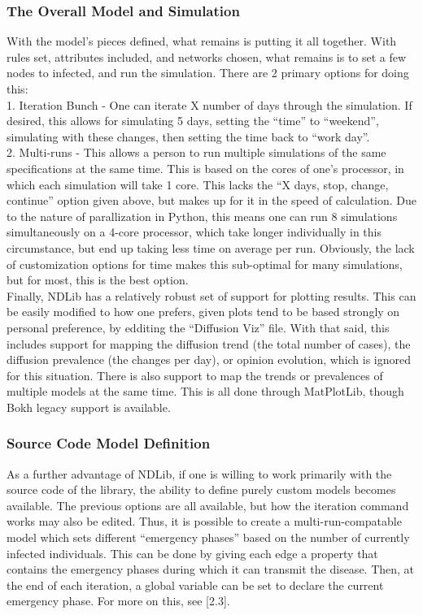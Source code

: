 \documentclass{article}
\numberwithin{equation}{section} %
\begin{document}
\begin{multicols}{2}
  \subsubsection{The Overall Model and Simulation}
  With the model's pieces defined, what remains is putting it all together. With rules set, attributes included, and networks chosen, what remains is to set a few nodes to infected, and run the simulation. There are 2 primary options for doing this: \\
  1. Iteration Bunch - One can iterate X number of days through the simulation. If desired, this allows for simulating 5 days, setting the ``time'' to ``weekend'', simulating with these changes, then setting the time back to ``work day''. \\
  2. Multi-runs - This allows a person to run multiple simulations of the same specifications at the same time. This is based on the cores of one's processor, in which each simulation will take 1 core. This lacks the ``X days, stop, change, continue'' option given above, but makes up for it in the speed of calculation. Due to the nature of parallization in Python, this means one can run 8 simulations simultaneously on a 4-core processor, which take longer individually in this circumstance, but end up taking less time on average per run. Obviously, the lack of customization options for time makes this sub-optimal for many simulations, but for most, this is the best option. \\

  Finally, NDLib has a relatively robust set of support for plotting results. This can be easily modified to how one prefers, given plots tend to be based strongly on personal preference, by edditing the ``Diffusion Viz'' file. With that said, this includes support for mapping the diffusion trend (the total number of cases), the diffusion prevalence (the changes per day), or opinion evolution, which is ignored for this situation. There is also support to map the trends or prevalences of multiple models at the same time. This is all done through MatPlotLib, though Bokh legacy support is available. 

  \subsubsection{Source Code Model Definition}
  As a further advantage of NDLib, if one is willing to work primarily with the source code of the library, the ability to define purely custom models becomes available. The previous options are all available, but how the iteration command works may also be edited. Thus, it is possible to create a multi-run-compatable model which sets different ``emergency phases'' based on the number of currently infected individuals. This can be done by giving each edge a property that contains the emergency phases during which it can transmit the disease. Then, at the end of each iteration, a global variable can be set to declare the current emergency phase. For more on this, see [2.3]. \\


\end{multicols}
\end{document}
